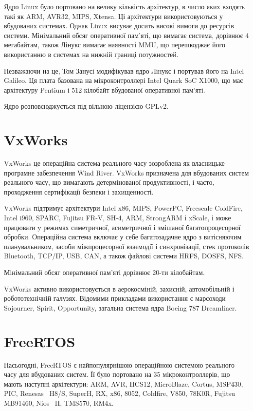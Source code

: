 \documentclass[oneside,14pt,a4paper,final]{myextreport}
\begin{document}
Ядро Linux було портовано на велику кількість архітектур, в число яких входять такі як ARM, AVR32, MIPS, Xtensa. Ці архітектури використовуються у вбудованих системах. Однак Linux висуває досить високі вимоги до ресурсів системи. Мінімальний обсяг оперативної пам'яті, що вимагає система, дорівнює 4 мегабайтам, також Лінукс вимагає наявності \ac{MMU}, що перешкоджає його використанню в системах на нижній границі потужностей.

Незважаючи на це, Том Занусі модифікував ядро Лінукс і портував його на Intel Galileo\cite{linux-galileo}. Ця плата базована на мікроконтроллері Intel Quark SoC X1000, що має архітектуру Pentium і 512 кілобайт вбудованої оперативної пам'яті\cite{intel-galileo}.

Ядро розповсюджується під вільною ліцензією GPLv2.

\section{VxWorks}

VxWorks\cite{vxworks} це операційна система реального часу зозроблена як власницьке програмне забезпечення Wind River. VxWorks призначена для вбудованих систем реального часу, що вимагають детермінованої продуктивності, і часто, проходження сертифікації безпеки і захищенності.

VxWorks підтримує архітектури Intel x86, MIPS, PowerPC, Freescale ColdFire, Intel i960, SPARC, Fujitsu FR-V, SH-4, ARM, StrongARM і xScale, і може працювати y режимах симетричної, асиметричної і змішаної багатопроцесорної обробки. Операційна система включає у себе багатозадачне ядро з витісняючим планувальником, засоби міжпроцесорної взаємодії і синхронізації, стек протоколів Bluetooth, \acs{TCP/IP}, \acs{USB}, \acs{CAN}, а також файлові системи \ac{HRFS}, \acs{DOSFS}, \ac{NFS}.

Мінімальний обсяг оперативної пам'яті дорівнює 20-ти кілобайтам.

VxWorks активно використовується в аерокосміній, захисній, автомобільній і робототехнічній галузях. Відомими прикладами використання є марсоходи Sojourner, Spirit, Opportunity\cite{vxworks:rovers}, загальна система ядра Boeing 787 Dreamliner\cite{vxworks:boeing}.

\section{FreeRTOS}

Насьогодні, FreeRTOS\cite{freertos} є найпопулярнішою операційною системою реального часу для вбудованих систем\cite{freertos:popular}. Її було портовано на 35 мікроконтроллерів, що мають наступні архітектури: ARM, AVR, HCS12, MicroBlaze, Cortus, MSP430, PIC, Renesas~ H8/S, SuperH, RX, x86, 8052, Coldfire, V850, 78K0R, Fujitsu MB91460, Nios~ II, TMS570, RM4x.
\end{document}
